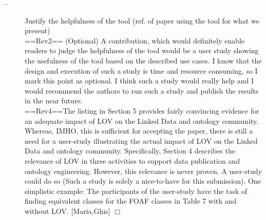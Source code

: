 \documentclass[a4paper,notitlepage]{article}
\newcommand\todo[2]{\item[--] #1 \hfill[#2] $\Box$}%
\begin{document}
\begin{description}
 \todo{Justify the helpfulness of the tool (ref. of paper using the tool for what we present) \\
==Rev2== (Optional) A contribution, which would definitely enable readers to judge the helpfulness of the tool would be a user study showing the usefulness of the tool based on the described use cases. I know that the design and execution of such a study is time and resource consuming, so I mark this point as optional. I think such a study would really help and I would recommend the authors to run such a study and publish the results in the near future.\\
==Rev4==The listing in Section 5 provides fairly convincing evidence for an adequate impact of LOV on the Linked Data and ontology community. Whereas, IMHO, this is sufficient for accepting the paper, there is still a need for a user-study illustrating the actual impact of LOV on the Linked Data and ontology community. Specifically, Section 4 describes the relevance of LOV in three activities to support data publication and ontology engineering. However, this relevance is never proven. A user-study could do so (Such a study is solely a nice-to-have for this submission). One simplistic example: The participants of the user-study have the task of finding equivalent classes for the FOAF classes in Table 7 with and without LOV.}{Maria,Ghis}
\end{description}
\end{document}

